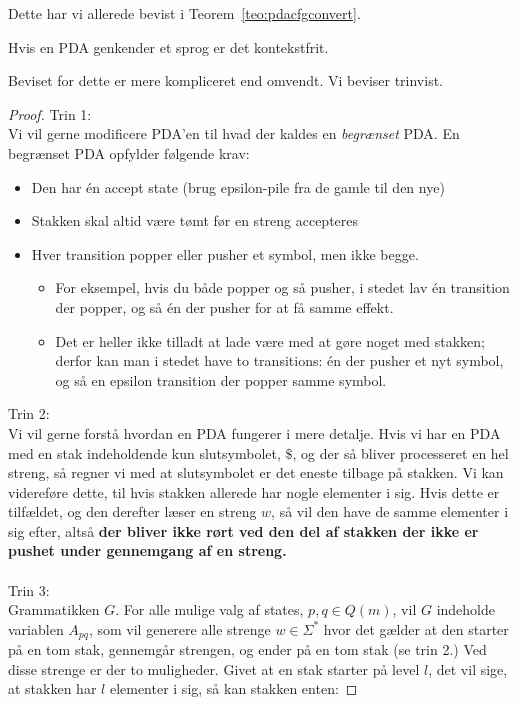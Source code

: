 Dette har vi allerede bevist i Teorem~\ref{teo:pdacfgconvert}.

\begin{lemma}
Hvis en PDA genkender et sprog er det kontekstfrit.
\end{lemma}
Beviset for dette er mere kompliceret end omvendt. Vi beviser trinvist.

\begin{proof}
  Trin 1:\\
  \noindent
  Vi vil gerne modificere PDA'en til hvad der kaldes en \textit{begrænset} PDA. En begrænset PDA opfylder følgende krav:
  \begin{itemize}
    \item Den har én accept state (brug epsilon-pile fra de gamle til den nye)
    \item Stakken skal altid være tømt før en streng accepteres
    \item Hver transition popper eller pusher et symbol, men ikke begge.
          \begin{itemize}
            \item For eksempel, hvis du både popper og så pusher, i stedet lav én transition der popper, og så én der pusher for at få samme effekt.
            \item Det er heller ikke tilladt at lade være med at gøre noget med stakken; derfor kan man i stedet have to transitions: én der pusher et nyt symbol, og så en epsilon transition der popper samme symbol.
          \end{itemize}
  \end{itemize}
  Trin 2:\\
  \noindent
  Vi vil gerne forstå hvordan en PDA fungerer i mere detalje. Hvis vi har en PDA med en stak indeholdende kun slutsymbolet, $\$$, og der så bliver processeret en hel streng, så regner vi med at slutsymbolet er det eneste tilbage på stakken. Vi kan videreføre dette, til hvis stakken allerede har nogle elementer i sig. Hvis dette er tilfældet, og den derefter læser en streng $w$, så vil den have de samme elementer i sig efter, altså \textbf{der bliver ikke rørt ved den del af stakken der ikke er pushet under gennemgang af en streng.}\\\\
  \noindent
  Trin 3:\\
  \noindent
  Grammatikken $G$. For alle mulige valg af states, $p, q \in Q(m)$, vil $G$ indeholde variablen $A_{pq}$, som vil generere alle strenge $w \in \Sigma^*$ hvor det gælder at den starter på en tom stak, gennemgår strengen, og ender på en tom stak (se trin 2.) Ved disse strenge er der to muligheder. Givet at en stak starter på level $l$, det vil sige, at stakken har $l$ elementer i sig, så kan stakken enten:

\end{proof}
